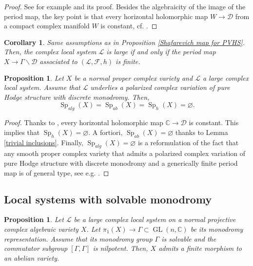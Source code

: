 \documentclass[11pt,letterpaper]{amsart}
\def\bC{\mathbb{C}}
\def\cD{\mathcal{D}}
\def\cF{\mathcal{F}}
\def\cL{\mathcal{L}}
\theoremstyle{plain}
\newtheorem{prop}[thm]{Proposition}
\newtheorem{cor}[thm]{Corollary}
\DeclareMathOperator{\Sp}{Sp}
\DeclareMathOperator{\GL}{GL}
\begin{document}
\begin{proof}
See for example \cite[Proposition 3.5]{CCE} and its proof. Besides the algebraicity of the image of the period map, the key point is that every horizontal holomorphic map $W \to \cD$ from a compact complex manifold $W$ is constant, cf. \cite[Corollary 8.3]{Griffiths-Schmid}. 
\end{proof}

\begin{cor}
Same assumptions as in Proposition \ref{Shafarevich map for PVHS}. Then, the complex local system $\cL$ is large if and only if the period map $X \to \Gamma \backslash \cD$ associated to $(\cL, \cF, h)$ is finite.
\end{cor}

\begin{prop}\label{Special sets with PVHS}
Let $X$ be a normal proper complex variety and $\cL$ a large complex local system. Assume that $\cL$ underlies a polarized complex variation of pure Hodge structure with discrete monodromy. Then, 
\[ \Sp_{alg}(X) =  \Sp_{ab}(X) =  \Sp_{h}(X) = \varnothing. \]
\end{prop}
\begin{proof}
Thanks to \cite[Corollary 9.4]{Griffiths-Schmid}, every horizontal holomorphic map $\bC \to \cD$ is constant. This implies that $ \Sp_{h}(X) = \varnothing$. A fortiori, $ \Sp_{ab}(X) = \varnothing$ thanks to Lemma \ref{trivial inclusions}. Finally, $\Sp_{alg}(X) = \varnothing$ is a reformulation of the fact that any smooth proper complex variety that admits a polarized complex variation of pure Hodge structure with discrete monodromy and a generically finite period map is of general type, see e.g. \cite[Proposition 3.5]{CCE}.
\end{proof}

\subsection{Local systems with solvable monodromy}

\begin{prop}\label{Shafarevich in the solvable case}
Let $\cL$ be a large complex local system on a normal projective complex algebraic variety $X$. Let $\pi_1(X) \to \Gamma \subset \GL(n , \bC)$ be its monodromy representation. Assume that its monodromy group $\Gamma$ is solvable and the commutator subgroup $[\Gamma, \Gamma]$ is nilpotent. Then, $X$ admits a finite morphism to an abelian variety.
\end{prop}
\end{document}
